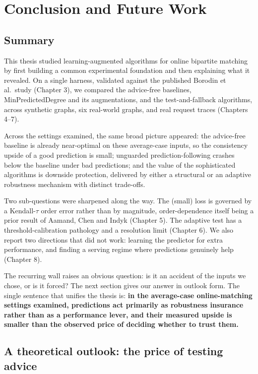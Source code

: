 \chapter{Conclusion and Future Work}

\section{Summary}

This thesis studied learning-augmented algorithms for online bipartite
matching by first building a common experimental foundation and then
explaining what it revealed. On a single harness, validated against the
published Borodin et al.~study (Chapter 3), we compared the advice-free
baselines, MinPredictedDegree and its augmentations, and the
test-and-fallback algorithms, across synthetic graphs, six real-world
graphs, and real request traces (Chapters 4--7).

Across the settings examined, the same broad picture appeared: the
advice-free baseline is already near-optimal on these average-case
inputs, so the consistency upside of a good prediction is small;
unguarded prediction-following crashes below the baseline under bad
predictions; and the value of the sophisticated algorithms is downside
protection, delivered by either a structural or an adaptive robustness
mechanism with distinct trade-offs.

Two sub-questions were sharpened along the way. The (small) loss is
governed by a Kendall-\(\tau\) order error rather than by magnitude,
order-dependence itself being a prior result of Aamand, Chen and Indyk
(Chapter 5). The adaptive test has a threshold-calibration pathology and
a resolution limit (Chapter 6). We also report two directions that did
not work: learning the predictor for extra performance, and finding a
serving regime where predictions genuinely help (Chapter 8).

The recurring wall raises an obvious question: is it an accident of the
inputs we chose, or is it forced? The next section gives our answer in
outlook form. The single sentence that unifies the thesis is: \textbf{in
the average-case online-matching settings examined, predictions act
primarily as robustness insurance rather than as a performance lever,
and their measured upside is smaller than the observed price of deciding
whether to trust them.}

\section{A theoretical outlook: the price of testing
advice}

